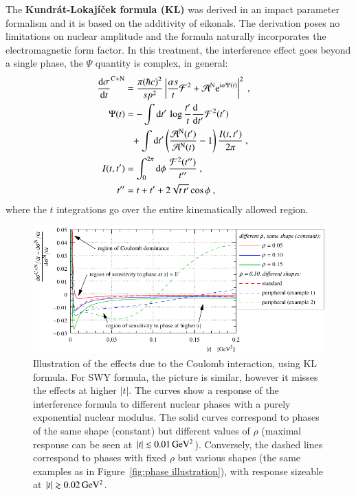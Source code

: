The {\bf Kundr\' at-Lokaj\' i\v cek formula (KL)} \cite{kl94} was derived in an impact parameter formalism and it is based on the additivity of eikonals. The derivation poses no limitations on nuclear amplitude and the formula naturally incorporates the electromagnetic form factor. In this treatment, the interference effect goes beyond a single phase, the $\Psi$ quantity is complex, in general:
\begin{equation}
\label{eq:int kl}
	\begin{aligned}
		{\d\sigma\over \d t}^{\rm C+N} &= {\pi (\hbar c)^2 \over s p^2} \left | {\alpha s\over t} {\cal F}^2 + {\cal A}^{\rm N} \e^{\I\alpha \Psi(t)} \right |^2\ ,\cr
		\Psi(t) &= 
			- \int \d t'\, \log {t'\over t} {\d\phantom{t'}\over \d t'} {\cal F}^2(t') \cr
		&\phantom{=} + \int \d t' \left( {{\cal A}^{\rm N}(t') \over {\cal A}^{\rm N}(t)} - 1 \right) { I(t, t')\over 2\pi }
			\ ,\cr
		I(t, t') &= \int_0^{2\pi} \d\phi\ {{\cal F}^2(t'')\over t''}\ , \cr
		t'' &= t + t' + 2\sqrt{t\, t'} \cos\phi\ ,\cr
	\end{aligned}
\end{equation}
where the $t$ integrations go over the entire kinematically allowed region.

\begin{figure}
\begin{center}
\includegraphics{fig/cni_effect_illustration.pdf}
\caption{%
Illustration of the effects due to the Coulomb interaction, using KL formula. For SWY formula, the picture is similar, however it misses the effects at higher $|t|$. The curves show a response of the interference formula to different nuclear phases with a purely exponential nuclear modulus. The solid curves correspond to phases of the same shape (constant) but different values of $\rho$ (maximal response can be seen at $|t| \lesssim 0.01\,{\rm GeV^2}$). Conversely, the dashed lines correspond to phases with fixed $\rho$ but various shapes (the same examples as in Figure~\ref{fig:phase illustration}), with response sizeable at $|t| \gtrsim 0.02\,{\rm GeV^2}$.
}
\label{fig:cni effect}
\end{center}
\end{figure}

